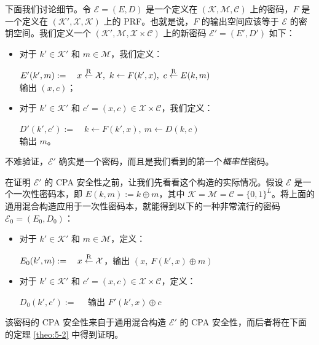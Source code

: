 下面我们讨论细节。令 $\mathcal{E}=(E,D)$ 是一个定义在 $(\mathcal{K},\mathcal{M},\mathcal{C})$ 上的密码，$F$ 是一个定义在 $(\mathcal{K}',\mathcal{X},\mathcal{K})$ 上的 PRF。也就是说，$F$ 的输出空间应该等于 $\mathcal{E}$ 的密钥空间。我们定义一个 $(\mathcal{K}',\mathcal{M},\mathcal{X}\times\mathcal{C})$ 上的新密码 $\mathcal{E}'=(E',D')$ 如下：
\begin{itemize}
	\item 对于 $k'\in\mathcal{K}'$ 和 $m\in\mathcal{M}$，我们定义：
	
	\hspace*{20pt} $E'(k',m):=\quad x\overset{\rm R}\leftarrow\mathcal{X},\ k\leftarrow F(k',x),\ c\overset{\rm R}\leftarrow E(k,m)$\\
	\hspace*{88pt} 输出 $(x,c)$；
	\item 对于 $k'\in\mathcal{K}'$ 和 $c'=(x,c)\in\mathcal{X}\times\mathcal{C}$，我们定义：
	
	\hspace*{20pt} $D'(k',c'):=\quad k\leftarrow F(k',x),\ m\leftarrow D(k,c)$\\
	\hspace*{88pt} 输出 $m$。
\end{itemize}    

不难验证，$\mathcal{E}'$ 确实是一个密码，而且是我们看到的第一个\emph{概率性}密码。

\begin{example}\label{exmp:5-2}
在证明 $\mathcal{E}'$ 的 CPA 安全性之前，让我们先看看这个构造的实际情况。假设 $\mathcal{E}$ 是一个一次性密码本，即 $E(k,m):=k\oplus m$，其中 $\mathcal{K}=\mathcal{M}=\mathcal{C}=\{0,1\}^L$。将上面的通用混合构造应用于一次性密码本，就能得到以下的一种非常流行的密码 $\mathcal{E}_0=(E_0,D_0)$：
\begin{itemize}
	\item 对于 $k'\in\mathcal{K}'$ 和 $m\in\mathcal{M}$，定义：
	
	\hspace*{20pt} $E_0(k',m):=\quad x\overset{\rm R}\leftarrow\mathcal{X}$，输出 $(x,\ F(k',x)\oplus m)$
	\item 对于 $k'\in\mathcal{K}'$ 和 $c'=(x,c)\in\mathcal{X}\times\mathcal{C}$，定义：
	
	\hspace*{20pt} $D_0(k',c'):=\quad$ 输出 $F'(k',x)\oplus c$
\end{itemize}
该密码的 CPA 安全性来自于通用混合构造 $\mathcal{E}'$ 的 CPA 安全性，而后者将在下面的定理 \ref{theo:5-2} 中得到证明。
\end{example}

